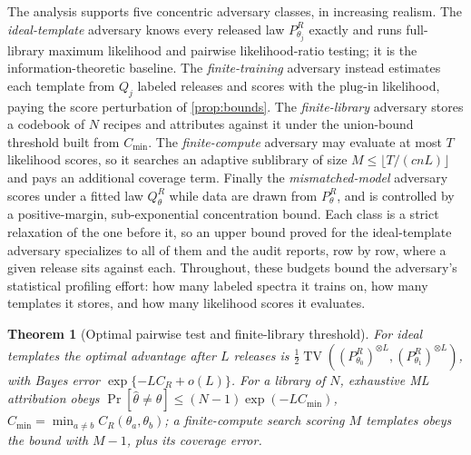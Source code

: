 \documentclass[11pt]{article}
\newtheorem{theorem}{Theorem}
\DeclareMathOperator{\TV}{TV}
\begin{document}
The analysis supports five concentric adversary classes, in increasing realism. The \emph{ideal-template} adversary knows every released law \(P_{\theta_j}^R\) exactly and runs full-library maximum likelihood and pairwise likelihood-ratio testing; it is the information-theoretic baseline. The \emph{finite-training} adversary instead estimates each template from \(Q_j\) labeled releases and scores with the plug-in likelihood, paying the score perturbation of \cref{prop:bounds}. The \emph{finite-library} adversary stores a codebook of \(N\) recipes and attributes against it under the union-bound threshold built from \(C_{\min}\). The \emph{finite-compute} adversary may evaluate at most \(T\) likelihood scores, so it searches an adaptive sublibrary of size \(M\le\lfloor T/(cnL)\rfloor\) and pays an additional coverage term. Finally the \emph{mismatched-model} adversary scores under a fitted law \(Q_\theta^R\) while data are drawn from \(P_\theta^R\), and is controlled by a positive-margin, sub-exponential concentration bound. Each class is a strict relaxation of the one before it, so an upper bound proved for the ideal-template adversary specializes to all of them and the audit reports, row by row, where a given release sits against each. Throughout, these budgets bound the adversary's statistical profiling effort: how many labeled spectra it trains on, how many templates it stores, and how many likelihood scores it evaluates.

\begin{theorem}[Optimal pairwise test and finite-library threshold]
\label{thm:binary}
For ideal templates the optimal advantage after \(L\) releases is \(\tfrac12\TV((P_{\theta_0}^R)^{\otimes L},(P_{\theta_1}^R)^{\otimes L})\), with Bayes error \(\exp\{-LC_R+o(L)\}\). For a library of \(N\), exhaustive ML attribution obeys \(\Pr[\widehat\theta\ne\theta]\le(N-1)\exp(-LC_{\min})\), \(C_{\min}=\min_{a\ne b}C_R(\theta_a,\theta_b)\); a finite-compute search scoring \(M\) templates obeys the bound with \(M-1\), plus its coverage error.
\end{theorem}
\end{document}
